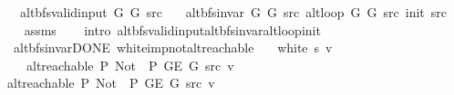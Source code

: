 \begin{isabellebody}
\ \ \ {\isachardoublequoteopen}alt{\isacharunderscore}{\kern0pt}bfs{\isacharunderscore}{\kern0pt}valid{\isacharunderscore}{\kern0pt}input{\isacharprime}{\kern0pt}\ G{}\ G{}\ src{\isachardoublequoteclose}\isanewline
\ \ \ {\isachardoublequoteopen}alt{\isacharunderscore}{\kern0pt}bfs{\isacharunderscore}{\kern0pt}invar{\isacharprime}{\kern0pt}\ G{}\ G{}\ src\ {\isacharparenleft}{\kern0pt}alt{\isacharunderscore}{\kern0pt}loop\ G{}\ G{}\ src\ {\isacharparenleft}{\kern0pt}init\ src{\isacharparenright}{\kern0pt}{\isacharparenright}{\kern0pt}{\isachardoublequoteclose}\isanewline
%
\isadelimproof
\ \ %
\endisadelimproof
%
\isatagproof
{}\isamarkupfalse%
\ assms\isanewline
\ \ \isamarkupfalse%
\ {\isacharparenleft}{\kern0pt}intro\ alt{\isacharunderscore}{\kern0pt}bfs{\isacharunderscore}{\kern0pt}valid{\isacharunderscore}{\kern0pt}input{\isachardot}{\kern0pt}alt{\isacharunderscore}{\kern0pt}bfs{\isacharunderscore}{\kern0pt}invar{\isacharunderscore}{\kern0pt}alt{\isacharunderscore}{\kern0pt}loop{\isacharunderscore}{\kern0pt}init{\isacharparenright}{\kern0pt}%
\endisatagproof
{\isafoldproof}%
%
\isadelimproof
%
\endisadelimproof
%
\isadelimdocument
%
\endisadelimdocument
%
\isatagdocument
%
\isamarkuptrue%
%
\isamarkuptrue%
%
\endisatagdocument
{\isafolddocument}%
%
\isadelimdocument
%
\endisadelimdocument
{}\isamarkupfalse%
\ {\isacharparenleft}{\kern0pt}\ alt{\isacharunderscore}{\kern0pt}bfs{\isacharunderscore}{\kern0pt}invar{\isacharunderscore}{\kern0pt}DONE{\isacharparenright}{\kern0pt}\ white{\isacharunderscore}{\kern0pt}imp{\isacharunderscore}{\kern0pt}not{\isacharunderscore}{\kern0pt}alt{\isacharunderscore}{\kern0pt}reachable{\isacharcolon}{\kern0pt}\isanewline
\ \ \ {\isachardoublequoteopen}white\ s\ v{\isachardoublequoteclose}\isanewline
\ \ \ {\isachardoublequoteopen}{\isasymnot}\ alt{\isacharunderscore}{\kern0pt}reachable\ P{\isacharprime}{\kern0pt}{\isacharprime}{\kern0pt}\ {\isacharparenleft}{\kern0pt}Not\ {\isasymcirc}\ P{\isacharprime}{\kern0pt}{\isacharprime}{\kern0pt}{\isacharparenright}{\kern0pt}\ {\isacharparenleft}{\kern0pt}G{\isachardot}{\kern0pt}E\ G{\isacharparenright}{\kern0pt}\ src\ v{\isachardoublequoteclose}\isanewline
%
\isadelimproof
%
\endisadelimproof
%
\isatagproof
{}\isamarkupfalse%
\isanewline
\ \ \isamarkupfalse%
\ {\isachardoublequoteopen}alt{\isacharunderscore}{\kern0pt}reachable\ P{\isacharprime}{\kern0pt}{\isacharprime}{\kern0pt}\ {\isacharparenleft}{\kern0pt}Not\ {\isasymcirc}\ P{\isacharprime}{\kern0pt}{\isacharprime}{\kern0pt}{\isacharparenright}{\kern0pt}\ {\isacharparenleft}{\kern0pt}G{\isachardot}{\kern0pt}E\ G{\isacharparenright}{\kern0pt}\ src\ v{\isachardoublequoteclose}\isanewline

\end{isabellebody}
